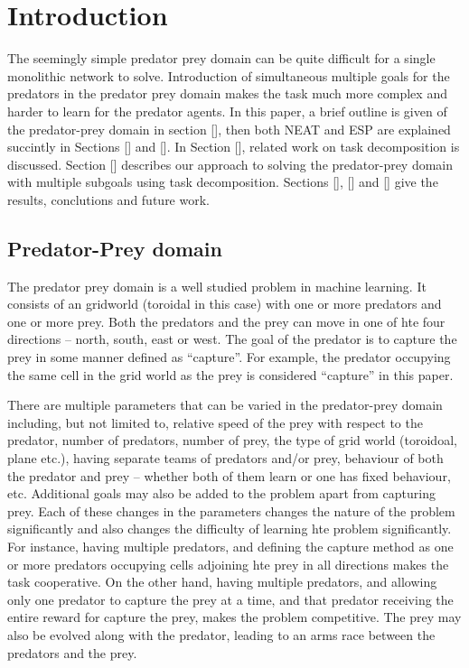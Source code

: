 \section{Introduction}
The seemingly simple predator prey domain can be quite difficult for a single monolithic network to solve. Introduction of simultaneous multiple goals for the predators in the predator prey domain makes the task much more complex and harder to learn for the predator agents.
    In this paper, a brief outline is given of the predator-prey domain in section [], then both NEAT and ESP are explained succintly in Sections [] and []. In Section [], related work on task decomposition is discussed. Section [] describes our approach to solving the predator-prey domain with multiple subgoals using task decomposition. Sections [], [] and [] give the results, conclutions and future work.

\subsection{Predator-Prey domain}
The predator prey domain is a well studied problem in machine learning. It consists of an gridworld (toroidal in this case) with one or more predators and one or more prey. Both the predators and the prey can move in one of hte four directions -- north, south, east or west. The goal of the predator is to capture the prey in some manner defined as “capture”. For example, the predator occupying the same cell in the grid world as the prey is considered “capture” in this paper.

    There are multiple parameters that can be varied in the predator-prey domain including, but not limited to, relative speed of the prey with respect to the predator, number of predators, number of prey, the type of grid world (toroidoal, plane etc.), having separate teams of predators and/or prey, behaviour of both the predator and prey -- whether both of them learn or one has fixed behaviour, etc. Additional goals may also be added to the problem apart from capturing prey. Each of these changes in the parameters changes the nature of the problem significantly and also changes the difficulty of learning hte problem significantly. For instance, having multiple predators, and defining the capture method as one or more predators occupying cells adjoining hte prey in all directions makes the task cooperative. On the other hand, having multiple predators, and allowing only one predator to capture the prey at a time, and that predator receiving the entire reward for capture the prey, makes the problem competitive. The prey may also be evolved along with the predator, leading to an arms race between the predators and the prey.

